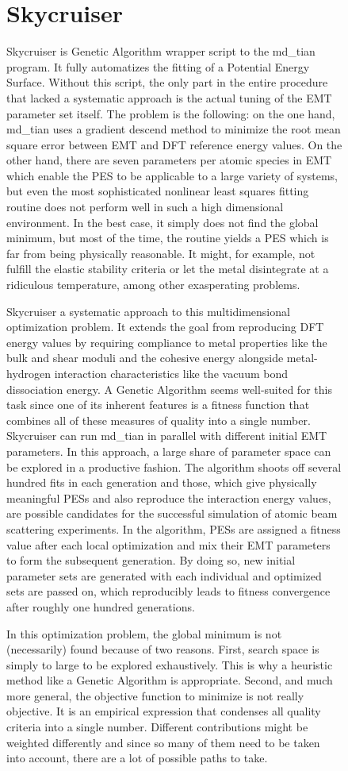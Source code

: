 \documentclass[twoside, 11pt, titlepage, captions=nooneline, a4paper, headsepline]{scrbook}%
\newcommand{\9}{\mathrm}
\newcommand{\0}{\,\mathrm}
\begin{document}
\begin{figure}[b!]
\chapter{Skycruiser}
Skycruiser is Genetic Algorithm wrapper script to the md\_tian program. It fully automatizes the fitting of a Potential Energy Surface. Without this script, the only part in the entire procedure that lacked a systematic approach is the actual tuning of the EMT parameter set itself. The problem is the following: on the one hand, md\_tian uses a gradient descend method to minimize the root mean square error between EMT and DFT reference energy values. On the other hand, there are seven parameters per atomic species in EMT which enable the PES to be applicable to a large variety of systems, but even the most sophisticated nonlinear least squares fitting routine does not perform well in such a high dimensional environment. In the best case, it simply does not find the global minimum, but most of the time, the routine yields a PES which is far from being physically reasonable. It might, for example, not fulfill the elastic stability criteria or let the metal disintegrate at a ridiculous temperature, among other exasperating problems.

Skycruiser a systematic approach to this multidimensional optimization problem. It extends the goal from reproducing DFT energy values by requiring compliance to metal properties like the bulk and shear moduli and the cohesive energy alongside metal-hydrogen interaction characteristics like the vacuum bond dissociation energy. A Genetic Algorithm seems well-suited for this task since one of its inherent features is a fitness function that combines all of these measures of quality into a single number. Skycruiser can run md\_tian in parallel with different initial EMT parameters. In this approach, a large share of parameter space can be explored in a productive fashion. The algorithm shoots off several hundred fits in each generation and those, which give physically meaningful PESs and also reproduce the interaction energy values, are possible candidates for the successful simulation of atomic beam scattering experiments. In the algorithm, PESs are assigned a fitness value after each local optimization and mix their EMT parameters to form the subsequent generation. By doing so, new initial parameter sets are generated with each individual and optimized sets are passed on, which reproducibly leads to fitness convergence after roughly one hundred generations.

In this optimization problem, the global minimum is not (necessarily) found because of two reasons. First, search space is simply to large to be explored exhaustively. This is why a heuristic method like a Genetic Algorithm is appropriate. Second, and much more general, the objective function to minimize is not really objective. It is an empirical expression that condenses all quality criteria into a single number. Different contributions might be weighted differently and since so many of them need to be taken into account, there are a lot of possible paths to take.


\end{figure}
\end{document}
